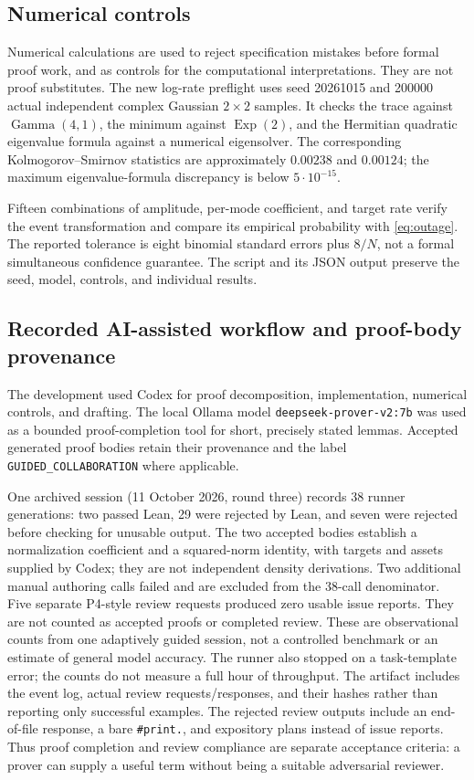 \documentclass[11pt]{article}
\newcommand{\lean}[1]{{\small\nolinkurl{#1}}}
\begin{document}
\subsection{Numerical controls}
Numerical calculations are used to reject specification mistakes before
formal proof work, and as controls for the computational interpretations.
They are not proof substitutes. The new log-rate preflight uses seed
20261015 and 200000 actual independent complex Gaussian $2\times2$ samples.
It checks the trace against $\operatorname{Gamma}(4,1)$, the minimum against
$\operatorname{Exp}(2)$, and the Hermitian quadratic eigenvalue formula against
a numerical eigensolver. The corresponding Kolmogorov--Smirnov statistics are
approximately $0.00238$ and $0.00124$; the maximum eigenvalue-formula discrepancy
is below $5\cdot10^{-15}$.

Fifteen combinations of amplitude, per-mode coefficient, and target rate
verify the event transformation and compare its empirical probability with
\eqref{eq:outage}. The reported tolerance is eight binomial standard errors
plus $8/N$, not a formal simultaneous confidence guarantee. The script and
its JSON output preserve the seed, model, controls, and individual results.

\subsection{Recorded AI-assisted workflow and proof-body provenance}
The development used Codex for proof decomposition, implementation, numerical
controls, and drafting. The local Ollama model
\lean{deepseek-prover-v2:7b} was used as a bounded proof-completion tool for
short, precisely stated lemmas. Accepted generated proof bodies retain their
provenance and the label \lean{GUIDED_COLLABORATION} where applicable.

One archived session (11 October 2026, round three) records 38 runner
generations: two passed Lean, 29 were rejected by Lean, and seven were rejected
before checking for unusable output. The two accepted bodies establish a
normalization coefficient and a squared-norm identity, with targets and assets
supplied by Codex; they are not independent density derivations. Two additional
manual authoring calls failed and are excluded from the 38-call denominator.
Five separate P4-style review requests produced zero usable issue reports.
They are not counted as accepted proofs or completed review. These are
observational counts from one adaptively guided session, not a controlled
benchmark or an estimate of general model accuracy. The runner also stopped
on a task-template error; the counts do not measure a full hour of throughput.
The artifact includes the event log, actual review requests/responses, and
their hashes rather than reporting only successful examples.
The rejected review outputs include an end-of-file response, a bare
\texttt{\#print.}, and expository plans instead of issue reports. Thus proof
completion and review compliance are separate acceptance criteria: a prover
can supply a useful term without being a suitable adversarial reviewer.
\end{document}
